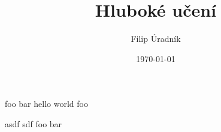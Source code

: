 \documentclass{beamer}
\title{Hluboké učení}
\author{Filip Úradník}
\date{\today}
\begin{document}
\maketitle

\begin{frame}{foo bar}
	hello \alert{world} foo
	\begin{block}{asdf}
		 sdf foo bar
	\end{block}
	
\end{frame}
\end{document}
